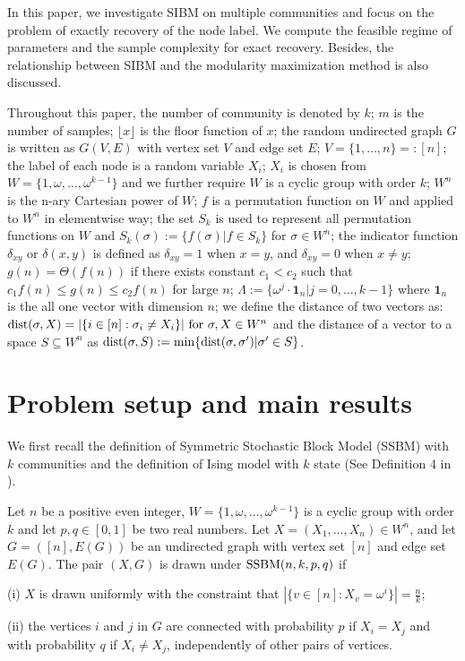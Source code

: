 \documentclass{article}
\begin{document}
In this paper, we  investigate SIBM on multiple communities and focus on the problem of exactly recovery of the node label.
We  compute the feasible regime of parameters and the sample complexity for exact recovery. Besides, the relationship between SIBM and the modularity maximization method
is also discussed. 

Throughout this paper, the number of community is denoted by $k$; $m$ is the number of samples; $\lfloor x \rfloor$ is the floor function of $x$; the random undirected graph $G$ is written as $G(V,E)$ with vertex set $V$ and edge set $E$;
$V=\{1,\dots, n\} =: [n]$;
the label of each node is a random variable $X_i$; $X_i$ is chosen from $W= \{1, \omega, \dots, \omega^{k-1}\}$ and we further require $W$
is a cyclic group with order $k$; $W^n$ is the n-ary Cartesian power of $W$; $f$ is a permutation function on $W$ and applied to $W^n$ in elementwise way; the set $S_k$ is used to represent all permutation functions on $W$ and $S_k(\sigma):=\{f(\sigma)| f\in S_k\}$ for $\sigma \in W^n$; the indicator function $\delta_{xy}$ or $\delta(x,y)$ is defined as
$\delta_{xy} = 1 $ when $x=y$, and $\delta_{xy}=0$ when $x\neq y$; $g(n) = \Theta(f(n))$ if there exists constant $c_1 < c_2$ such that $c_1 f(n) \leq g(n) \leq c_2 f(n)$
for large $n$;
$\Lambda := \{ \omega^j  \cdot \mathbf{1}_n | j=0, \dots,k-1\}$
where $\mathbf{1}_n$ is the all one vector with dimension $n$;
we define the distance of two vectors as:
$\operatorname{dist}(\sigma, X)
=|\{i\in[n]:\sigma_i\neq X_i\}| \textrm{ for } \sigma,X\in W^n
$ and the distance of a vector to a space $S\subseteq W^n$
as
$\operatorname{dist}(\sigma,S)
:=\min\{\operatorname{dist}(\sigma, \sigma') | \sigma' \in S\}
$.
\section{Problem setup and main results} \label{s:Preliminaries}
We first recall the definition of Symmetric Stochastic Block Model (SSBM) with $k$ communities and the definition of Ising model with $k$ state (See Definition 4 in \cite{Abbe17}).
\begin{definition} \label{def:SSBM}
Let $n$ be a positive even integer, $W= \{1, \omega, \dots, \omega^{k-1}\}$ is a cyclic group with order $k$ and let $p,q\in[0,1]$ be two real numbers. Let $X=(X_1,\dots,X_n)\in W^n$, and let $G=([n],E(G))$ be an undirected graph with vertex set $[n]$ and edge set $E(G)$. The pair $(X,G)$ is drawn under $\operatorname{SSBM}(n,k,p,q)$ if 

\noindent
(i) $X$ is drawn uniformly with the constraint that $|\{v \in [n] : X_v = \omega^i\}| = \frac{n}{k}$;

\noindent
(ii) the vertices $i$ and $j$ in $G$ are connected with probability $p$ if $X_i=X_j$ and with probability $q$ if $X_i \neq X_j$, independently of other pairs of vertices.
\end{definition}
 
\end{document}
